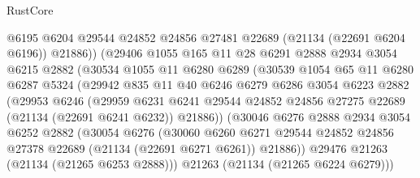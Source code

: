 \begin{lexlean}{RustCore}
\begin{coremodule}
                      @6195
                      @6204
                      @29544
                      @24852
                      @24856
                      @27481
                      @22689
                      (@21134 (@22691 @6204 @6196))
                      @21886))
                  (@29406
                    @1055
                    @165
                    @11
                    @28
                    @6291
                    @2888
                    @2934
                    @3054
                    @6215
                    @2882
                    (@30534
                      @1055
                      @11
                      @6280
                      @6289
                      (@30539
                        @1054
                        @65
                        @11
                        @6280
                        @6287
                        @5324
                        (@29942
                          @835
                          @11
                          @40
                          @6246
                          @6279
                          @6286
                          @3054
                          @6223
                          @2882
                          (@29953
                            @6246
                            (@29959
                              @6231
                              @6241
                              @29544
                              @24852
                              @24856
                              @27275
                              @22689
                              (@21134 (@22691 @6241 @6232))
                              @21886))
                          (@30046
                            @6276
                            @2888
                            @2934
                            @3054
                            @6252
                            @2882
                            (@30054
                              @6276
                              (@30060
                                @6260
                                @6271
                                @29544
                                @24852
                                @24856
                                @27378
                                @22689
                                (@21134 (@22691 @6271 @6261))
                                @21886))
                            @29476
                            @21263
                            (@21134 (@21265 @6253 @2888)))
                          @21263
                          (@21134 (@21265 @6224 @6279)))

\end{coremodule}
\end{lexlean}
